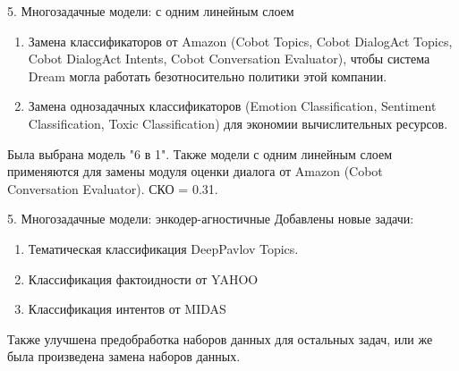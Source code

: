\begin{frame}{5. Многозадачные модели: с одним линейным слоем}
\begin{enumerate}
\item {\small Замена классификаторов от Amazon (Cobot Topics, Cobot DialogAct Topics, Cobot DialogAct Intents, Cobot Conversation Evaluator), чтобы система Dream могла работать безотносительно политики этой компании.}
\item {\small Замена однозадачных классификаторов (Emotion Classification, Sentiment Classification, Toxic Classification) для экономии вычислительных ресурсов.}
\end{enumerate}
\begin{table}[htbp]
\caption{Точность на различных задачах для разных типов однозадачных моделей, в сравнении с многозадачными. }
\end{table}
{\small Была выбрана модель "6 в 1".} \newline
{\small Также модели с одним линейным слоем применяются для замены модуля оценки диалога от Amazon (Cobot Conversation Evaluator). СКО = 0.31. }
\end{frame}


\begin{frame}{5. Многозадачные модели: энкодер-агностичные}
Добавлены новые задачи: 
\begin{enumerate}
    \item Тематическая классификация DeepPavlov Topics.
    \item Классификация фактоидности от YAHOO
    \item Классификация интентов от MIDAS
\end{enumerate}
 Также улучшена предобработка наборов данных для остальных задач, или же была произведена замена наборов данных.
\end{frame}

